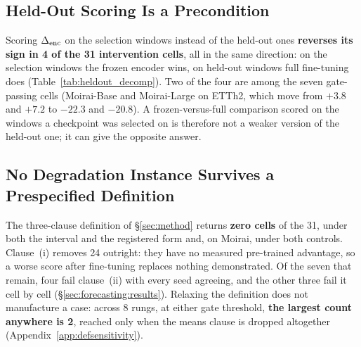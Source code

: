 \begin{table}[t]
\centering\small\setlength{\tabcolsep}{2.8pt}
\caption{\textbf{The two Traffic cells} ($h{=}24$).  $\denc$ is held-out, paired on
seed, mean${\pm}$SEM over 5 seeds with a two-sided $t$-interval; positive would mean
freezing was better.  ``Freeze wins'' counts the seeds where it was.  Generated by
\texttt{scripts/score\_second\_family.py}.}
\label{tab:secondfamily}

\end{table}

\subsection{Held-Out Scoring Is a Precondition}
\label{sec:analysis:heldout}

Scoring $\denc$ on the selection windows instead of the held-out ones
\textbf{reverses its sign in 4 of the 31 intervention cells}, all in the same
direction: on the selection windows the frozen encoder wins, on held-out windows
full fine-tuning does (Table~\ref{tab:heldout_decomp}).  Two of the four are
among the seven gate-passing cells (Moirai-Base and Moirai-Large on ETTh2, which
move from $+3.8$ and $+7.2$ to $-22.3$ and $-20.8$).  A frozen-versus-full comparison
scored on the windows a checkpoint was selected on is therefore not a weaker
version of the held-out one; it can give the opposite answer.

\subsection{No Degradation Instance Survives a Prespecified Definition}
\label{sec:analysis:degradation}

The three-clause definition of \S\ref{sec:method} returns \textbf{zero cells} of
the 31, under both the interval and the registered form and, on Moirai, under
both controls.  Clause~(i) removes 24 outright: they have no measured pre-trained
advantage, so a worse score after fine-tuning replaces nothing demonstrated.
Of the seven that remain, four fail clause~(ii) with every seed agreeing, and
the other three fail it cell by cell (\S\ref{sec:forecasting:results}).
Relaxing the definition does not manufacture a case: across 8 rungs, at either
gate threshold, \textbf{the largest count anywhere is 2}, reached only when the
means clause is dropped altogether (Appendix~\ref{app:defsensitivity}).

